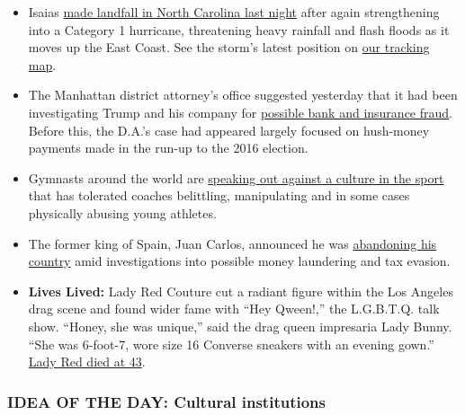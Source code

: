 \begin{itemize}
\item
  Isaias
  \href{https://www.nytimes3xbfgragh.onion/2020/08/04/us/isaias-storm-updates.html}{made
  landfall in North Carolina last night} after again strengthening into
  a Category 1 hurricane, threatening heavy rainfall and flash floods as
  it moves up the East Coast. See the storm's latest position on
  \href{https://www.nytimes3xbfgragh.onion/interactive/2020/07/31/us/hurricane-isaias-tracker-map.html}{our
  tracking map}.
\item
  The Manhattan district attorney's office suggested yesterday that it
  had been investigating Trump and his company for
  \href{https://www.nytimes3xbfgragh.onion/2020/08/03/nyregion/donald-trump-taxes-cyrus-vance.html}{possible
  bank and insurance fraud}. Before this, the D.A.'s case had appeared
  largely focused on hush-money payments made in the run-up to the 2016
  election.
\item
  Gymnasts around the world are
  \href{https://www.nytimes3xbfgragh.onion/2020/08/03/sports/olympics/gymnastics-abuse-athlete-a.html}{speaking
  out against a culture in the sport} that has tolerated coaches
  belittling, manipulating and in some cases physically abusing young
  athletes.
\item
  The former king of Spain, Juan Carlos, announced he was
  \href{https://www.nytimes3xbfgragh.onion/2020/08/03/world/europe/juan-carlos-leaves-spain.html}{abandoning
  his country} amid investigations into possible money laundering and
  tax evasion.
\item
  \textbf{Lives Lived:} Lady Red Couture cut a radiant figure within the
  Los Angeles drag scene and found wider fame with ``Hey Qween!,'' the
  L.G.B.T.Q. talk show. ``Honey, she was unique,'' said the drag queen
  impresaria Lady Bunny. ``She was 6-foot-7, wore size 16 Converse
  sneakers with an evening gown.''
  \href{https://www.nytimes3xbfgragh.onion/2020/08/01/arts/lady-red-couture-dead.html}{Lady
  Red died at 43}.
\end{itemize}

\hypertarget{idea-of-the-day-cultural-institutions}{%
\subsubsection{\texorpdfstring{\textbf{IDEA OF THE DAY: Cultural
institutions}}{IDEA OF THE DAY: Cultural institutions}}\label{idea-of-the-day-cultural-institutions}}

